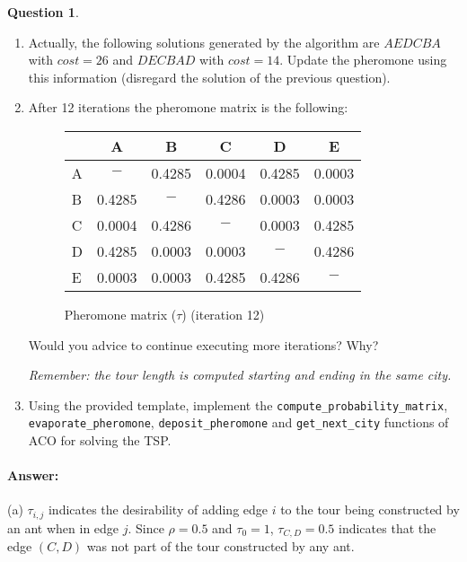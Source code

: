 \documentclass[11pt,a4paper]{article}
\theoremstyle{definition}%
\newtheorem{Q}{Question}[] %
\newcommand{\reponse}[1]{%
\ifthenelse {\boolean{corrige}} {\paragraph{Answer:} \color{darkblue}   #1\color{black}} {}
}
\begin{document}
\begin{Q}
\begin{enumerate}
 \item Actually, the following solutions generated by the algorithm are $AEDCBA$ with $cost=26$ and $DECBAD$ with $cost=14$. Update the pheromone using this information (disregard the solution of the previous question).
     \item After 12 iterations the pheromone matrix is the following:
        \begin{figure}[ht]
           \centering
           \begin{tabular} {| l | c |c | c | c | c |}
            \hline
                &  A  &  B  &  C  &  D  & E   \\
            \hline
              A & $-$     &  0.4285  &  0.0004  &  0.4285  & 0.0003   \\
              B &  0.4285 & $-$      &  0.4286  &  0.0003  & 0.0003  \\  
              C &  0.0004 &  0.4286  & $-$      &  0.0003  & 0.4285   \\
              D &  0.4285 &  0.0003  &  0.0003  & $-$      & 0.4286   \\
              E &  0.0003 &  0.0003  &  0.4285  &  0.4286  & $-$  \\
            \hline
            \end{tabular}
            \caption{Pheromone matrix ($\tau$) (iteration 12)}
        \end{figure}
         
         Would you advice to continue executing more iterations? Why?

 \textit{Remember: the tour length is computed starting and ending in the same city.}
 
\item Using the provided template, implement the \verb!compute_probability_matrix!, \verb!evaporate_pheromone!, \verb!deposit_pheromone! and \verb!get_next_city! functions of ACO for solving the TSP.

 \end{enumerate}

 \reponse{
    (a) $\tau_{i,j}$ indicates the desirability of adding edge $i$ to the tour being constructed 
    by an ant when in edge $j$. Since $\rho=0.5$ and $\tau_0=1$, $\tau_{C,D}=0.5$ indicates that 
    the edge $(C,D)$ was not part of the tour constructed by any ant.

}
\end{Q}
\end{document}
